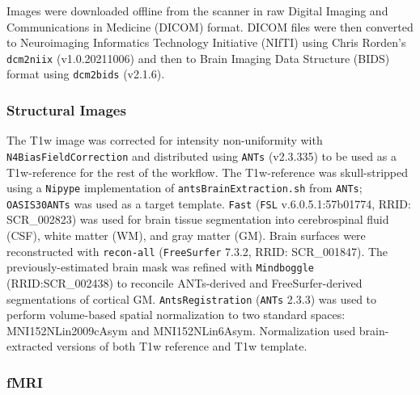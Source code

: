 \documentclass[
true
]{sn-jnl}
\begin{document}
Images were downloaded offline from the scanner in raw Digital Imaging
and Communications in Medicine (DICOM) format. DICOM files were then
converted to Neuroimaging Informatics Technology Initiative (NIfTI)
using Chris Rorden's \texttt{dcm2niix}
\citep{liFirstStepNeuroimaging2016} (v1.0.20211006) and then to Brain
Imaging Data Structure (BIDS) \citep{gorgolewskiBrainImagingData2016}
format using \texttt{dcm2bids} \citep{boreDcm2Bids2023} (v2.1.6).

\subsubsection{Structural Images}\label{structural-images}

The T1w image was corrected for intensity non-uniformity with
\texttt{N4BiasFieldCorrection} \citep{tustisonN4ITKImprovedN32010} and
distributed using \texttt{ANTs}
\citep{avantsSymmetricDiffeomorphicImage2008} (v2.3.335) to be used as a
T1w-reference for the rest of the workflow. The T1w-reference was
skull-stripped using a \texttt{Nipype}
\citep{gorgolewskiNipypeFlexibleLightweight2016} implementation of
\texttt{antsBrainExtraction.sh} from \texttt{ANTs}; \texttt{OASIS30ANTs}
was used as a target template. \texttt{Fast}
\citep{zhangSegmentationBrainMR2001} (\texttt{FSL}
\citep{smithAdvancesFunctionalStructural2004} v.6.0.5.1:57b01774, RRID:
SCR\_002823) was used for brain tissue segmentation into cerebrospinal
fluid (CSF), white matter (WM), and gray matter (GM). Brain surfaces
were reconstructed with \texttt{recon-all}
\citep{daleCorticalSurfacebasedAnalysis1999} (\texttt{FreeSurfer}
\citep{daleCorticalSurfacebasedAnalysis1999} 7.3.2, RRID: SCR\_001847).
The previously-estimated brain mask was refined with \texttt{Mindboggle}
\citep{kleinMindbogglingMorphometryHuman2017} (RRID:SCR\_002438) to
reconcile ANTs-derived and FreeSurfer-derived segmentations of cortical
GM. \texttt{AntsRegistration}
\citep{avantsSymmetricDiffeomorphicImage2008} (\texttt{ANTs} 2.3.3) was
used to perform volume-based spatial normalization to two standard
spaces: MNI152NLin2009cAsym and MNI152NLin6Asym. Normalization used
brain-extracted versions of both T1w reference and T1w template.

\subsubsection{fMRI}\label{fmri}
\end{document}
